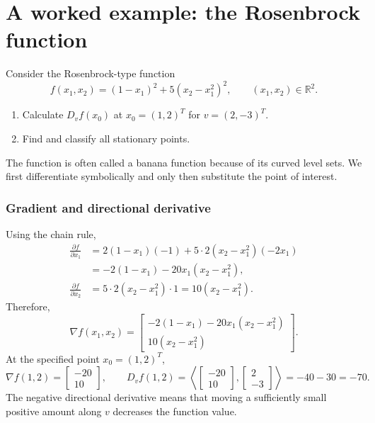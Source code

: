 \clearpage
\section{A worked example: the Rosenbrock function}
\label{sec:lec07-rosenbrock}
\begin{example}
Consider the Rosenbrock-type function
\begin{equation}
 f(x_1,x_2)=(1-x_1)^2+5(x_2-x_1^2)^2,
 \qquad (x_1,x_2)\in\mathbb{R}^2.
 \label{eq:lec07-rosenbrock}
\end{equation}
\begin{enumerate}
 \item Calculate $D_vf(x_0)$ at $x_0=(1,2)^T$ for $v=(2,-3)^T$.
 \item Find and classify all stationary points.
\end{enumerate}
\end{example}
The function is often called a banana function because of its curved level sets. We first differentiate symbolically and only then substitute the point of interest.

\subsubsection*{Gradient and directional derivative}
Using the chain rule,
\begin{align*}
 \frac{\partial f}{\partial x_1}
 &=2(1-x_1)(-1)+5\cdot2(x_2-x_1^2)(-2x_1)\\
 &=-2(1-x_1)-20x_1(x_2-x_1^2),\\
 \frac{\partial f}{\partial x_2}
 &=5\cdot2(x_2-x_1^2)\cdot1=10(x_2-x_1^2).
\end{align*}
Therefore,
\begin{equation}
 \nabla f(x_1,x_2)=\begin{bmatrix}
 -2(1-x_1)-20x_1(x_2-x_1^2)\\
 10(x_2-x_1^2)
 \end{bmatrix}.
 \label{eq:lec07-rosenbrock-gradient}
\end{equation}
At the specified point $x_0=(1,2)^T$,
\[
 \nabla f(1,2)=\begin{bmatrix}-20\\10\end{bmatrix},
 \qquad
 D_vf(1,2)=\left\langle\begin{bmatrix}-20\\10\end{bmatrix},
 \begin{bmatrix}2\\-3\end{bmatrix}\right\rangle
 =-40-30=\boxed{-70}.
\]
The negative directional derivative means that moving a sufficiently small positive amount along $v$ decreases the function value.

